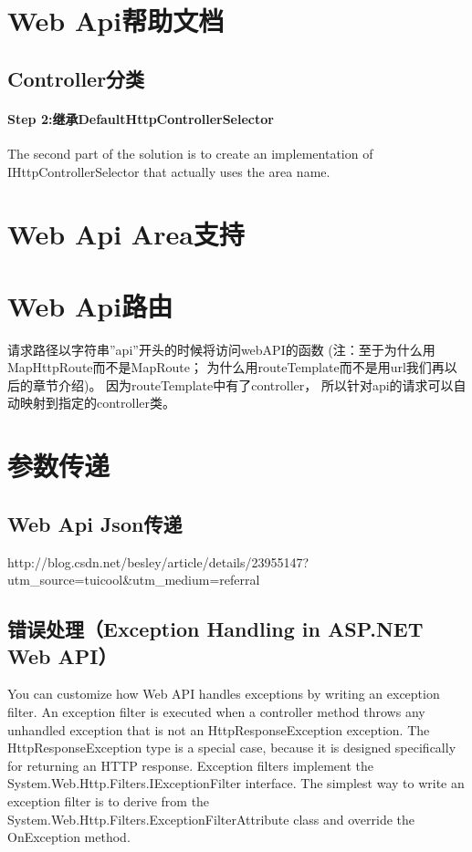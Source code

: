 \documentclass{book}
\begin{document}
\section{Web Api帮助文档}

\subsection{Controller分类}

\paragraph{Step 2:继承DefaultHttpControllerSelector}The second part of the solution is to create an implementation of IHttpControllerSelector that actually uses the area name. 





\section{Web Api Area支持}

\section{Web Api路由}

请求路径以字符串”api”开头的时候将访问webAPI的函数
(注：至于为什么用MapHttpRoute而不是MapRoute；
为什么用routeTemplate而不是用url我们再以后的章节介绍)。
因为routeTemplate中有了{controller}，
所以针对api的请求可以自动映射到指定的controller类。


\section{参数传递}


\subsection{Web Api Json传递}

http://blog.csdn.net/besley/article/details/23955147?utm\_source=tuicool\&utm\_medium=referral

\subsection{错误处理（Exception Handling in ASP.NET Web API）}

You can customize how Web API handles exceptions by writing an exception filter. 
An exception filter is executed when a controller method throws 
any unhandled exception that is not an HttpResponseException exception. 
The HttpResponseException type is a special case, 
because it is designed specifically for returning an HTTP response.
Exception filters implement the System.Web.Http.Filters.IExceptionFilter interface. 
The simplest way to write an exception filter is to derive from the System.Web.Http.Filters.ExceptionFilterAttribute class and override the OnException method.
\end{document}
